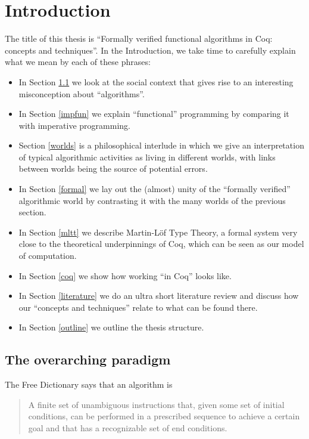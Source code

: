 \documentclass[declaration,mgr,english,shortabstract]{iithesis}
\author         {Wojciech Kołowski}
\date           {Wrzesień 2021} %
\begin{document}

\chapter{Introduction} \label{introduction}

The title of this thesis is ``Formally verified functional algorithms in Coq: concepts and techniques''. In the Introduction, we take time to carefully explain what we mean by each of these phrases:

\begin{itemize}
    \item In Section \ref{paradigm} we look at the social context that gives rise to an interesting misconception about ``algorithms''.
    \item In Section \ref{impfun} we explain ``functional'' programming by comparing it with imperative programming.
    \item Section \ref{worlds} is a philosophical interlude in which we give an interpretation of typical algorithmic activities as living in different worlds, with links between worlds being the source of potential errors.
    \item In Section \ref{formal} we lay out the (almost) unity of the ``formally verified'' algorithmic world by contrasting it with the many worlds of the previous section.
    \item In Section \ref{mltt} we describe Martin-L\"{o}f Type Theory, a formal system very close to the theoretical underpinnings of Coq, which can be seen as our model of computation.
    \item In Section \ref{coq} we show how working ``in Coq'' looks like.
    \item In Section \ref{literature} we do an ultra short literature review and discuss how our ``concepts and techniques'' relate to what can be found there.
    \item In Section \ref{outline} we outline the thesis structure.
\end{itemize}

\section{The overarching paradigm} \label{paradigm}

The Free Dictionary says \cite{TheFreeDictionary} that an algorithm is

\begin{quote}
    A finite set of unambiguous instructions that, given some set of initial conditions, can be performed in a prescribed sequence to achieve a certain goal and that has a recognizable set of end conditions.
\end{quote}
\end{document}
